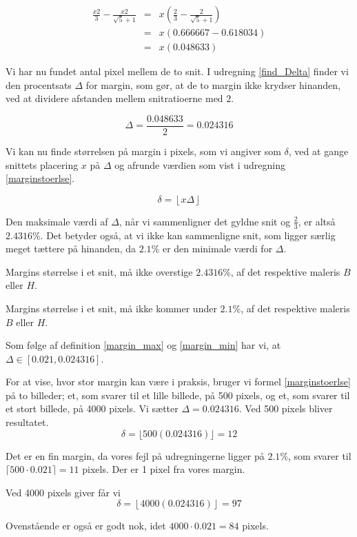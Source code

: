 {\begin{eqnarray}
	\frac{x2}{3} - \frac{x2}{\sqrt{5}+1} & = & x(\frac{2}{3} - \frac{2}{\sqrt{5} + 1}) \nonumber \\
	& = & x(0.666667-0.618034) \label{diff_snit}\\ \nonumber
	& = & x(0.048633)
\end{eqnarray}

Vi har nu fundet antal pixel mellem de to snit. I udregning
\ref{find_Delta} finder vi den procentsats $\Delta$ for margin, som gør,
at de to margin ikke krydser hinanden, ved at dividere afstanden mellem
snitratioerne med $2$.

\begin{equation}
    \Delta = \frac{0.048633}{2} = 0.024316
    \label{find_Delta}
\end{equation}

Vi kan nu finde størrelsen på margin i pixels, som vi angiver som
$\delta$, ved at gange snittets placering $x$ på $\Delta$ og afrunde
værdien som vist i udregning \ref{marginstoerlse}.

\begin{equation}
	\delta = \left\lfloor x\Delta \right\rfloor
    \label{marginstoerlse}
\end{equation}

Den maksimale værdi af $\Delta$, når vi sammenligner det gyldne snit og
$\frac{2}{3}$, er altså $2.4316\%$. Det betyder også, at vi ikke kan
sammenligne snit, som ligger særlig meget tættere på hinanden, da
$2.1\%$ er den minimale værdi for $\Delta$.

\begin{definition}
    Margins størrelse i et snit, må ikke overstige $2.4316 \%$, af det
    respektive maleris $B$ eller $H$.
	\label{margin_max}
\end{definition}

\begin{definition}
	Margins størrelse i et snit, må ikke kommer under $2.1 \%$, af det
    respektive maleris $B$ eller $H$.
	\label{margin_min}
\end{definition}

Som følge af definition \ref{margin_max} og \ref{margin_min} har vi, at
$\Delta \in [0.021, 0.024316]$.

For at vise, hvor stor margin kan være i praksis, bruger vi formel
\ref{marginstoerlse} på to billeder; et, som svarer til et lille
billede, på 500 pixels, og et, som svarer til et stort billede, på 4000
pixels.  Vi sætter $\Delta = 0.024316$.  Ved 500 pixels bliver
resultatet.
\begin{equation}
	 \delta = \lfloor 500(0.024316)\rfloor = 12
\end{equation}

Det er en fin margin, da vores fejl på udregningerne ligger på $2.1\%$,
som svarer til $\lceil 500 \cdot 0.021 \rceil = 11$ pixels. Der er 1 pixel fra
vores margin.

Ved 4000 pixels giver får vi
\begin{equation}
	 \delta = \left\lfloor 4000(0.024316)\right\rfloor = 97
\end{equation}

Ovenstående er også er godt nok, idet $4000 \cdot 0.021 = 84$ pixels.

\clearpage
}
